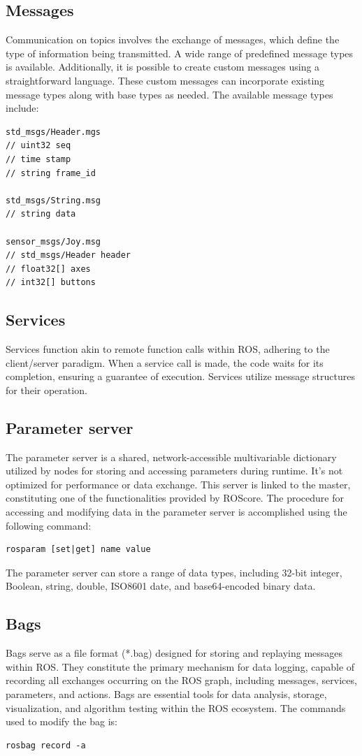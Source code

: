 \subsection{Messages}
Communication on topics involves the exchange of messages, which define the type of information being transmitted. 
A wide range of predefined message types is available.
Additionally, it is possible to create custom messages using a straightforward language. 
These custom messages can incorporate existing message types along with base types as needed.
The available message types include:
\begin{verbatim}
std_msgs/Header.mgs
// uint32 seq
// time stamp
// string frame_id

std_msgs/String.msg
// string data

sensor_msgs/Joy.msg
// std_msgs/Header header
// float32[] axes
// int32[] buttons
\end{verbatim}

\subsection{Services}
Services function akin to remote function calls within ROS, adhering to the client/server paradigm. 
When a service call is made, the code waits for its completion, ensuring a guarantee of execution. 
Services utilize message structures for their operation.

\subsection{Parameter server}
The parameter server is a shared, network-accessible multivariable dictionary utilized by nodes for storing and accessing parameters during runtime. 
It's not optimized for performance or data exchange. 
This server is linked to the master, constituting one of the functionalities provided by ROScore.
The procedure for accessing and modifying data in the parameter server is accomplished using the following command:
\begin{verbatim}
rosparam [set|get] name value
\end{verbatim}
The parameter server can store a range of data types, including 32-bit integer, Boolean, string, double, ISO8601 date, and base64-encoded binary data.

\subsection{Bags}
Bags serve as a file format (*.bag) designed for storing and replaying messages within ROS.\@ 
They constitute the primary mechanism for data logging, capable of recording all exchanges occurring on the ROS graph, including messages, services, parameters, and actions. 
Bags are essential tools for data analysis, storage, visualization, and algorithm testing within the ROS ecosystem.
The commands used to modify the bag is: 
\begin{verbatim}
rosbag record -a
\end{verbatim}

